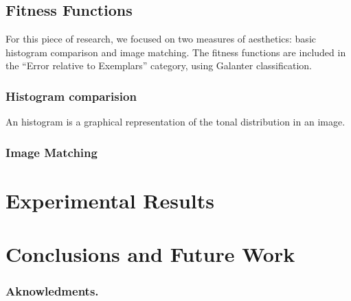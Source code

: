 \documentclass[conference]{IEEEtran}
\begin{document}
\subsection{Fitness Functions}\label{go:fitness} 
For this piece of research, we focused on two measures of aesthetics: basic histogram comparison and image matching. The fitness functions are included in the ``Error relative to Exemplars'' category, using Galanter \cite{galanter2012computational} classification.
\subsubsection{Histogram comparision}\label{go:fitness:hist}
An histogram is a graphical representation of the tonal distribution in an image. 
\subsubsection{Image Matching}\label{go:fitness:image_match}

\section{Experimental Results} \label{exper}

\section{Conclusions and Future Work}\label{conclusions}

\subsubsection*{Aknowledments.} 



\end{document}
